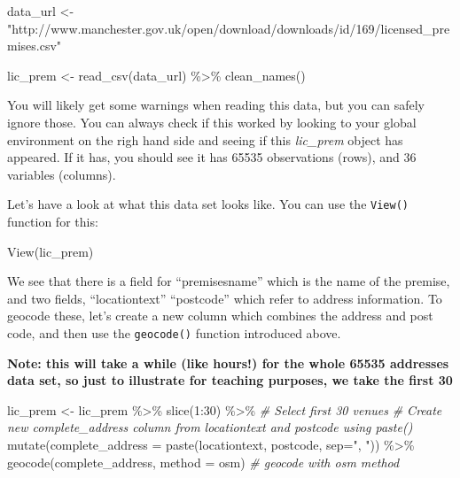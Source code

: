 \documentclass[
]{book}
\makeatletter
\newenvironment{Shaded}{\begin{snugshade}}{\end{snugshade}}
\newcommand{\AttributeTok}[1]{\textcolor[rgb]{0.61,0.61,0.61}{#1}}
\newcommand{\CommentTok}[1]{\textcolor[rgb]{0.37,0.37,0.37}{\textit{#1}}}
\newcommand{\DecValTok}[1]{\textcolor[rgb]{0.06,0.06,0.06}{#1}}
\newcommand{\FunctionTok}[1]{\textcolor[rgb]{0,0,0}{#1}}
\newcommand{\NormalTok}[1]{#1}
\newcommand{\OtherTok}[1]{\textcolor[rgb]{0.37,0.37,0.37}{#1}}
\newcommand{\SpecialCharTok}[1]{\textcolor[rgb]{0,0,0}{#1}}
\newcommand{\StringTok}[1]{\textcolor[rgb]{0.5,0.5,0.5}{#1}}
\newenvironment{kframe}{%
\medskip{}
\setlength{\fboxsep}{.8em}
 \def\at@end@of@kframe{}%
 \ifinner\ifhmode%
  \def\at@end@of@kframe{\end{minipage}}%
  \begin{minipage}{\columnwidth}%
 \fi\fi%
 \def\FrameCommand##1{\hskip\@totalleftmargin \hskip-\fboxsep
 \colorbox{shadecolor}{##1}\hskip-\fboxsep
     \hskip-\linewidth \hskip-\@totalleftmargin \hskip\columnwidth}%
 \MakeFramed {\advance\hsize-\width
   \@totalleftmargin\z@ \linewidth\hsize
   \@setminipage}}%
 {\par\unskip\endMakeFramed%
 \at@end@of@kframe}
\renewenvironment{Shaded}{\begin{kframe}}{\end{kframe}}
\makeatother
\begin{document}
\begin{Shaded}
\begin{Highlighting}[]
\NormalTok{data\_url }\OtherTok{\textless{}{-}} \StringTok{"http://www.manchester.gov.uk/open/download/downloads/id/169/licensed\_premises.csv"}

\NormalTok{lic\_prem }\OtherTok{\textless{}{-}} \FunctionTok{read\_csv}\NormalTok{(data\_url) }\SpecialCharTok{\%\textgreater{}\%} 
  \FunctionTok{clean\_names}\NormalTok{()}
\end{Highlighting}
\end{Shaded}

You will likely get some warnings when reading this data, but you can safely ignore those. You can always check if this worked by looking to your global environment on the righ hand side and seeing if this \emph{lic\_prem} object has appeared. If it has, you should see it has 65535 observations (rows), and 36 variables (columns).

Let's have a look at what this data set looks like. You can use the \texttt{View()} function for this:

\begin{Shaded}
\begin{Highlighting}[]
\FunctionTok{View}\NormalTok{(lic\_prem)}
\end{Highlighting}
\end{Shaded}

We see that there is a field for ``premisesname'' which is the name of the premise, and two fields, ``locationtext'' ``postcode'' which refer to address information. To geocode these, let's create a new column which combines the address and post code, and then use the \texttt{geocode()} function introduced above.

\textbf{Note: this will take a while (like hours!) for the whole 65535 addresses data set, so just to illustrate for teaching purposes, we take the first 30}

\begin{Shaded}
\begin{Highlighting}[]
\NormalTok{lic\_prem }\OtherTok{\textless{}{-}}\NormalTok{ lic\_prem }\SpecialCharTok{\%\textgreater{}\%} 
  \FunctionTok{slice}\NormalTok{(}\DecValTok{1}\SpecialCharTok{:}\DecValTok{30}\NormalTok{) }\SpecialCharTok{\%\textgreater{}\%}    \CommentTok{\# Select first 30 venues}
  \CommentTok{\# Create new complete\_address column from locationtext and postcode using paste()}
  \FunctionTok{mutate}\NormalTok{(}\AttributeTok{complete\_address =} \FunctionTok{paste}\NormalTok{(locationtext, }
\NormalTok{                                  postcode, }
                                  \AttributeTok{sep=}\StringTok{", "}\NormalTok{)) }\SpecialCharTok{\%\textgreater{}\%}     
  \FunctionTok{geocode}\NormalTok{(complete\_address, }\AttributeTok{method =} \StringTok{\textquotesingle{}osm\textquotesingle{}}\NormalTok{)  }\CommentTok{\# geocode with osm method}
\end{Highlighting}
\end{Shaded}
\end{document}
